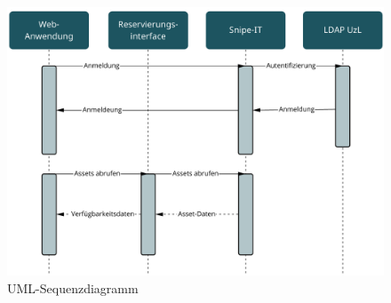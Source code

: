 \begin{figure}[h]
    \centering
    \includegraphics[scale=0.45]{Bilder/uml.pdf}
    \caption[UML-Sequenzdiagramm]{UML-Sequenzdiagramm}
    \label{fig:uml}
\end{figure}


